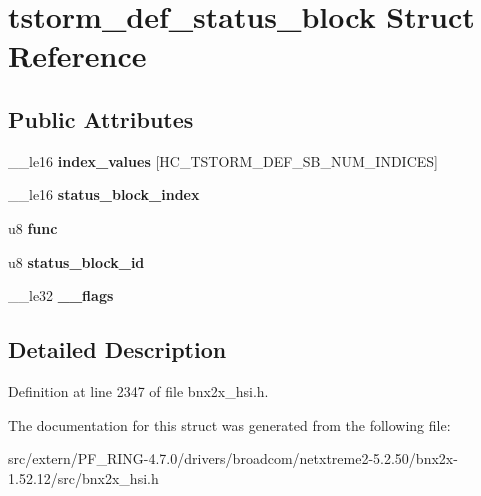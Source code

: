 \hypertarget{structtstorm__def__status__block}{
\section{tstorm\_\-def\_\-status\_\-block Struct Reference}
\label{structtstorm__def__status__block}
}
\subsection*{Public Attributes}
\begin{DoxyCompactItemize}
\item 
\hypertarget{structtstorm__def__status__block_aaf95b8587b92a2faeb944d8a036f1c23}{
\_\-\_\-le16 {\bfseries index\_\-values} \mbox{[}HC\_\-TSTORM\_\-DEF\_\-SB\_\-NUM\_\-INDICES\mbox{]}}
\label{structtstorm__def__status__block_aaf95b8587b92a2faeb944d8a036f1c23}

\item 
\hypertarget{structtstorm__def__status__block_a82503bf617f78cf49d9ff5540a020066}{
\_\-\_\-le16 {\bfseries status\_\-block\_\-index}}
\label{structtstorm__def__status__block_a82503bf617f78cf49d9ff5540a020066}

\item 
\hypertarget{structtstorm__def__status__block_a80557676be6113196a52cbd152c93bf4}{
u8 {\bfseries func}}
\label{structtstorm__def__status__block_a80557676be6113196a52cbd152c93bf4}

\item 
\hypertarget{structtstorm__def__status__block_a6c9c92ece9f48918f9e4c1c49daaefd9}{
u8 {\bfseries status\_\-block\_\-id}}
\label{structtstorm__def__status__block_a6c9c92ece9f48918f9e4c1c49daaefd9}

\item 
\hypertarget{structtstorm__def__status__block_a7590f68a092686fca623ffbd98fec6e6}{
\_\-\_\-le32 {\bfseries \_\-\_\-flags}}
\label{structtstorm__def__status__block_a7590f68a092686fca623ffbd98fec6e6}

\end{DoxyCompactItemize}


\subsection{Detailed Description}


Definition at line 2347 of file bnx2x\_\-hsi.h.



The documentation for this struct was generated from the following file:\begin{DoxyCompactItemize}
\item 
src/extern/PF\_\-RING-\/4.7.0/drivers/broadcom/netxtreme2-\/5.2.50/bnx2x-\/1.52.12/src/bnx2x\_\-hsi.h\end{DoxyCompactItemize}
